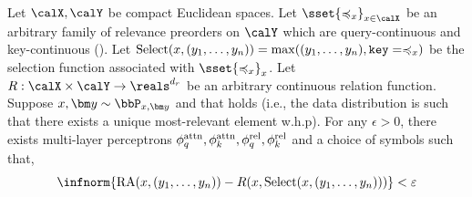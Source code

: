 \begin{theorem*}%
  Let $\calX, \calY$ be compact Euclidean spaces. Let $\sset{\preceq_x}_{x \in \calX}$ be an arbitrary family of relevance preorders on $\calY$ which are query-continuous and key-continuous (). Let $\mathrm{Select}(x, (y_1, \ldots, y_n)) = \max((y_1, \ldots, y_n), \mathtt{key}=\preccurlyeq_x)$ be the selection function associated with $\sset{\preceq_x}_{x}$. Let $R: \calX \times \calY \to \reals^{d_r}$ be an arbitrary continuous relation function. Suppose $x, \y \sim \bbP_{x, \y}$ and that  holds (i.e., the data distribution is such that there exists a unique most-relevant element w.h.p). For any $\epsilon > 0$, there exists multi-layer perceptrons $\phi_q^{\mathrm{attn}}, \phi_k^{\mathrm{attn}}, \phi_q^{\mathrm{rel}}, \phi_k^{\mathrm{rel}}$ and a choice of symbols such that,
  \begin{equation*}
    \infnorm{\RA(x, \ys) - R(x, \mathrm{Select}(x, \ys))} < \epsilon
  \end{equation*}
\end{theorem*}

